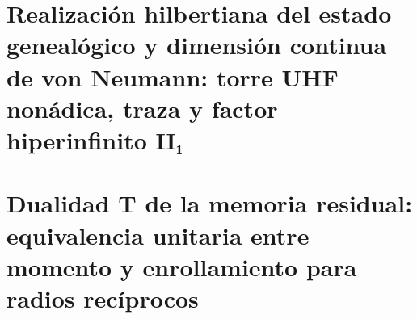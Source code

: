 \chapter{Realización hilbertiana del estado genealógico y dimensión continua de von Neumann: torre UHF nonádica, traza y factor hiperinfinito II₁}
\label{chap:sucesor-102-23}



















\chapter{Dualidad T de la memoria residual: equivalencia unitaria entre momento y enrollamiento para radios recíprocos}
\label{chap:sucesor-102-24}
\label{chap:dualidad-t-memoria-residual}

\begingroup
\newcount\HMTFZeroEightThreeSubsection
{}
\let\HMTFZeroEightThreeOriginalSubsection\subsection
\renewcommand{\subsection}[1]{%
  \advance\HMTFZeroEightThreeSubsection by 1
  \ifnum\HMTFZeroEightThreeSubsection=3
    \HMTFZeroEightThreeOriginalSubsection{Extensión operatorial de APP: separación entre modos visibles y modos de memoria}%
  \else
    \HMTFZeroEightThreeOriginalSubsection{#1}%
  \fi
}

\endgroup













